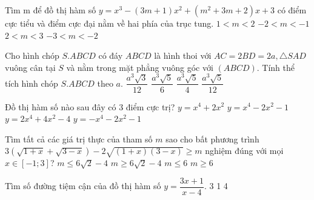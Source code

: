 \begin{ex}%
Tìm m để đồ thị hàm số $y=x^3-(3m+1)x^2+(m^2+3m+2)x+3$ có điểm cực tiểu và điểm cực đại nằm về hai phía của trục tung.
\choice
{$1<m<2$}
{\True $-2<m<-1$}
{$2<m<3$}
{$-3<m<-2$}
\end{ex} 
\begin{ex}%
Cho hình chóp $S.ABCD$ có đáy $ABCD$ là hình thoi với $AC=2BD=2a,\triangle SAD$ vuông cân tại $S$ và nằm trong mặt phẳng vuông góc với $(ABCD)$. Tính thể tích hình chóp $S.ABCD$ theo $a$.
\choice
{$\dfrac{a^3\sqrt{3}}{12}$}
{$\dfrac{a^3\sqrt{5}}{6}$}
{$\dfrac{a^3\sqrt{5}}{4}$}
{\True $\dfrac{a^3\sqrt{5}}{12}$}
\end{ex}
\begin{ex}%
Đồ thị hàm số nào sau đây có 3 điểm cực trị?
\choice
{$y=x^4+2x^2$}
{\True $y=x^4-2x^2-1$}
{$y=2x^4+4x^2-4$}
{$y=-x^4-2x^2-1$}
\end{ex}
\begin{ex}%
Tìm tất cả các giá trị thực của tham số $m$ sao cho bất phương trình \\$3\left(\sqrt{1+x}+\sqrt{3-x}\right)-2\sqrt{(1+x)(3-x)} \geq m$ nghiệm đúng với mọi $x \in [-1;3]$?
\choice
{\True $m \leq 6\sqrt{2}-4$}
{$m \geq 6\sqrt{2}-4$}
{$m \leq 6$}
{$m \geq 6$}
\end{ex}
\begin{ex}%
Tìm số đường tiệm cận của đồ thị hàm số $y=\dfrac{3x+1}{x-4}$.
\choice
{3}
{}
{1}
{4}
\end{ex}

